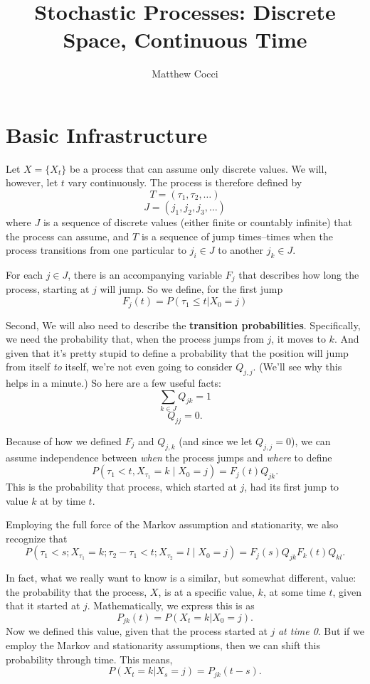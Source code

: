 \documentclass[a4paper,11pt]{scrartcl}
\title{Stochastic Processes: Discrete Space, Continuous Time}
\author{Matthew Cocci}
\begin{document}
\maketitle

\section{Basic Infrastructure}

Let $X = \{ X_t \}$ be a process that can assume only discrete values.  
We will, however, let $t$ vary continuously.  The process is therefore 
defined by
	\[ T = ( \tau_1, \tau_2, \ldots) \]
	\[ J = ( j_1, j_2, j_3, \ldots) \]
where $J$ is a sequence of discrete values (either finite or countably 
infinite) that the process can assume, and $T$ is a sequence of jump 
times--times when the process transitions from one particular to 
$j_i \in J$ to another $j_k \in J$.

For each $j \in J$, there is an accompanying variable $F_j$ that 
describes how long the process, starting at $j$ will jump.  So we define,
for the first jump
	\[ F_j(t) = P( \tau_1 \leq t | X_0 = j )\]

Second, We will also need to describe the \textbf{transition 
probabilities}.  
Specifically, we need the probability that, when the process jumps from 
$j$, it moves to $k$.  And given that it's pretty stupid to define a 
probability that the position will jump from itself \emph{to} itself, 
we're not even going to consider $Q_{j,j}$. 
(We'll see why this helps in a minute.)  So here are a few useful facts:
	\[ \sum_{k \in J} Q_{jk} = 1 \]
	\[ Q_{jj} = 0. \]

Because of how we defined $F_j$ and $Q_{j,k}$ (and since we let $Q_{j,j} 
= 0$), we can assume independence between \emph{when} the process jumps 
and \emph{where} to define
	\[ P(\tau_1 < t, X_{\tau_1}=k\;|\; X_0 =j) = F_j(t)Q_{jk}. \]
This is the probability that process, which started at $j$, had its 
first jump to value $k$ at by time $t$.

Employing the full force of the Markov assumption and stationarity, we 
also recognize that
  \[ P(\tau_1 < s; X_{\tau_1}=k; \tau_2 - \tau_1 < t; X_{\tau_2} = l\;| 
     \; X_0 = j) = F_j(s)Q_{jk}F_k(t)Q_{kl}. \]

In fact, what we really want to know is a similar, but somewhat 
different, value: the probability that the process, $X$, is 
at a specific 
value, $k$, at some time $t$, given that it started at $j$.  
Mathematically, we express this is as
	\[ P_{jk}(t) = P(X_t = k | X_0 = j). \]
Now we defined this value, given that the process started at 
$j$ \emph{at time 0}. But if we employ the Markov and stationarity 
assumptions, then we can shift this probability through time. This means,
	\[ P(X_t = k | X_s = j) = P_{jk}(t-s). \]
\end{document}
